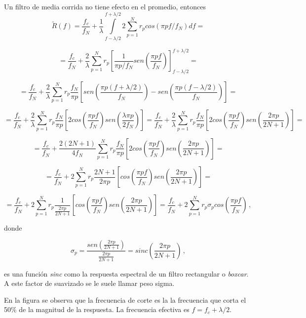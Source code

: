 \documentclass[
]{agujournal2019}
\begin{document}
Un filtro de media corrida no tiene efecto en el promedio, entonces
\[\widetilde{R}(f)=\frac{f_c}{f_N} + \frac{1}{\lambda}
\int\limits^{f+\lambda/2}_{f-\lambda/2} 2 \sum\limits^{N}_{p=1}
r_pcos(\pi p f / f_N)d{f}=\]

\[=\frac{f_c}{f_N} + \frac{2}{\lambda}\sum\limits^{N}_{p=1} r_p
\left[\frac{1}{\pi p /f_N} sen\left( \frac{\pi p
f}{f_N}\right)\right]^{f+\lambda/2}_{f-\lambda/2}=\]

\[=\frac{f_c}{f_N}+ \frac{2}{\lambda}\sum\limits^{N}_{p=1}
r_p\frac{f_N}{\pi p}\left[sen\left( \frac{\pi p
(f+\lambda/2)}{f_N}\right)-sen\left( \frac{\pi p
(f-\lambda/2)}{f_N}\right) \right]=\]

\[=\frac{f_c}{f_N}+ \frac{2}{\lambda}\sum\limits^{N}_{p=1}
r_p\frac{f_N}{\pi p}\left[2cos\left( \frac{\pi p
f}{f_N}\right)sen\left( \frac{\lambda \pi p}{2f_N}\right) \right]=
\frac{f_c}{f_N}+ \frac{2}{\lambda}\sum\limits^{N}_{p=1}
r_p\frac{f_N}{\pi p}\left[2cos\left( \frac{\pi p
f}{f_N}\right)sen\left( \frac{2 \pi p}{2N+1}\right) \right]=\]

\[=\frac{f_c}{f_N}+ \frac{2(2N+1)}{4f_N}\sum\limits^{N}_{p=1}
r_p\frac{f_N}{\pi p}\left[2cos\left( \frac{\pi p
f}{f_N}\right)sen\left( \frac{2 \pi p}{2N+1}\right) \right]=\]

\[=\frac{f_c}{f_N}+ 2\sum\limits^{N}_{p=1}
r_p\frac{2N+1}{2 \pi p}\left[cos\left( \frac{\pi p
f}{f_N}\right)sen\left( \frac{2 \pi p}{2N+1}\right) \right]=\]

\[=\frac{f_c}{f_N}+ 2\sum\limits^{N}_{p=1}
r_p\frac{1}{\frac{2 \pi p}{2N+1}}\left[cos\left( \frac{\pi p
f}{f_N}\right)sen\left( \frac{2 \pi p}{2N+1}\right) \right]=
\frac{f_c}{f_N}+ 2\sum\limits^{N}_{p=1}
r_p \sigma_p cos\left( \frac{\pi p
f}{f_N}\right)\,,\]

donde

\[\sigma_p=\frac{sen\left( \frac{2 \pi p}{2N+1}\right)}{\frac{2 \pi p}{2N+1}}= sinc\left(\frac{2 \pi p}{2N+1} \right)\,,\]

es una función \emph{sinc} como la respuesta espectral de un filtro
rectangular o \emph{boxcar}. A este factor de suavizado se le suele
llamar peso sigma.

\begin{center}
\end{center}

En la figura se observa que la frecuencia de corte es la la frecuencia
que corta el 50\% de la magnitud de la respuesta. La frecuencia efectiva
es \(f=f_c+\lambda/2\).
\end{document}

